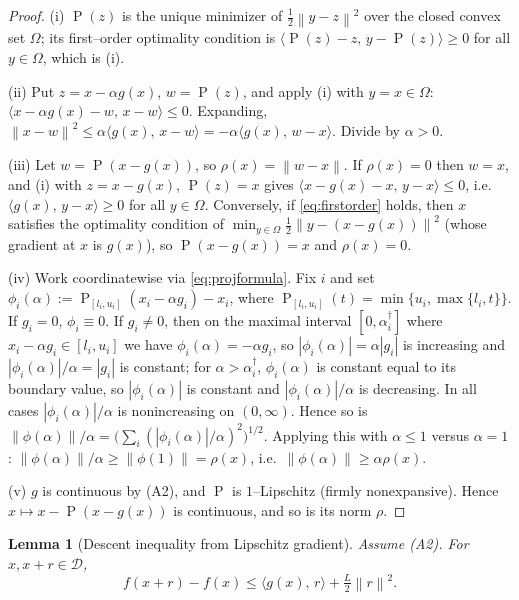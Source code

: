 \documentclass[12pt]{article}
\newtheorem{lemma}{Lemma}
\DeclareMathOperator{\proj}{P}
\newcommand{\norm}[1]{\left\lVert #1 \right\rVert}
\newcommand{\inner}[2]{\langle #1,\, #2\rangle}
\begin{document}
\begin{proof}
(i) $\proj(z)$ is the unique minimizer of $\tfrac12\norm{y-z}^2$ over the
closed convex set $\Omega$; its first--order optimality condition is
$\inner{\proj(z)-z}{y-\proj(z)}\ge0$ for all $y\in\Omega$, which is (i).

(ii) Put $z=x-\alpha g(x)$, $w=\proj(z)$, and apply (i) with $y=x\in\Omega$:
$\inner{x-\alpha g(x)-w}{x-w}\le0$. Expanding,
$\norm{x-w}^2\le\alpha\inner{g(x)}{x-w}=-\alpha\inner{g(x)}{w-x}$. Divide by
$\alpha>0$.

(iii) Let $w=\proj(x-g(x))$, so $\rho(x)=\norm{w-x}$. If $\rho(x)=0$ then
$w=x$, and (i) with $z=x-g(x)$, $\proj(z)=x$ gives
$\inner{x-g(x)-x}{y-x}\le0$, i.e.\ $\inner{g(x)}{y-x}\ge0$ for all
$y\in\Omega$. Conversely, if \eqref{eq:firstorder} holds, then $x$ satisfies
the optimality condition of $\min_{y\in\Omega}\tfrac12\norm{y-(x-g(x))}^2$
(whose gradient at $x$ is $g(x)$), so $\proj(x-g(x))=x$ and $\rho(x)=0$.

(iv) Work coordinatewise via \eqref{eq:projformula}. Fix $i$ and set
$\phi_i(\alpha):=\proj_{[l_i,u_i]}(x_i-\alpha g_i)-x_i$, where
$\proj_{[l_i,u_i]}(t)=\min\{u_i,\max\{l_i,t\}\}$. If $g_i=0$, $\phi_i\equiv0$.
If $g_i\neq0$, then on the maximal interval $[0,\alpha_i^\dagger]$ where
$x_i-\alpha g_i\in[l_i,u_i]$ we have $\phi_i(\alpha)=-\alpha g_i$, so
$|\phi_i(\alpha)|=\alpha|g_i|$ is increasing and $|\phi_i(\alpha)|/\alpha=|g_i|$
is constant; for $\alpha>\alpha_i^\dagger$, $\phi_i(\alpha)$ is constant equal to
its boundary value, so $|\phi_i(\alpha)|$ is constant and $|\phi_i(\alpha)|/\alpha$
is decreasing. In all cases $|\phi_i(\alpha)|/\alpha$ is nonincreasing on
$(0,\infty)$. Hence so is
$\norm{\phi(\alpha)}/\alpha=\big(\sum_i(|\phi_i(\alpha)|/\alpha)^2\big)^{1/2}$.
Applying this with $\alpha\le1$ versus $\alpha=1$:
$\norm{\phi(\alpha)}/\alpha\ge\norm{\phi(1)}=\rho(x)$, i.e.\
$\norm{\phi(\alpha)}\ge\alpha\rho(x)$.

(v) $g$ is continuous by (A2), and $\proj$ is $1$--Lipschitz (firmly
nonexpansive). Hence $x\mapsto x-\proj(x-g(x))$ is continuous, and so is its
norm $\rho$.
\end{proof}

\begin{lemma}[Descent inequality from Lipschitz gradient]\label{lem:taylor}
Assume (A2). For $x,x+r\in\mathcal D$,
\begin{equation}\label{eq:desclemma}
f(x+r)-f(x)\le\inner{g(x)}{r}+\tfrac{L}{2}\norm{r}^2 .
\end{equation}
\end{lemma}
\end{document}
